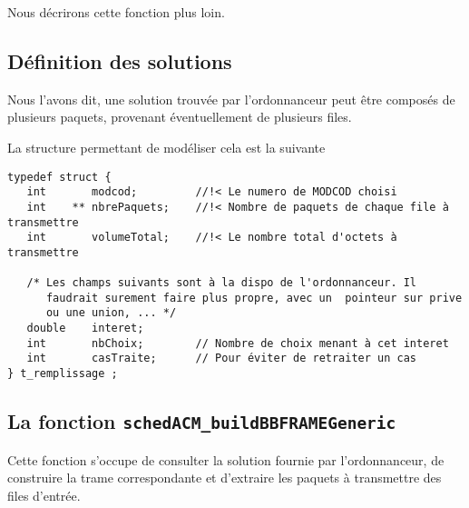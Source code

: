    Nous décrirons cette fonction plus loin.

%
\subsection{Définition des solutions}

   Nous l'avons dit, une solution trouvée par l'ordonnanceur peut être
composés de plusieurs paquets, provenant éventuellement de
plusieurs files.

   La structure permettant de modéliser cela est la suivante

\begin{verbatim}
typedef struct {
   int       modcod;         //!< Le numero de MODCOD choisi
   int    ** nbrePaquets;    //!< Nombre de paquets de chaque file à transmettre
   int       volumeTotal;    //!< Le nombre total d'octets à transmettre

   /* Les champs suivants sont à la dispo de l'ordonnanceur. Il
      faudrait surement faire plus propre, avec un  pointeur sur prive
      ou une union, ... */
   double    interet;
   int       nbChoix;        // Nombre de choix menant à cet interet
   int       casTraite;      // Pour éviter de retraiter un cas
} t_remplissage ;
\end{verbatim}


%
\subsection{La fonction {\tt schedACM\_buildBBFRAMEGeneric}}

   Cette fonction s'occupe de consulter la solution fournie par
l'ordonnanceur, de construire la trame correspondante et d'extraire
les paquets à transmettre des files d'entrée.

